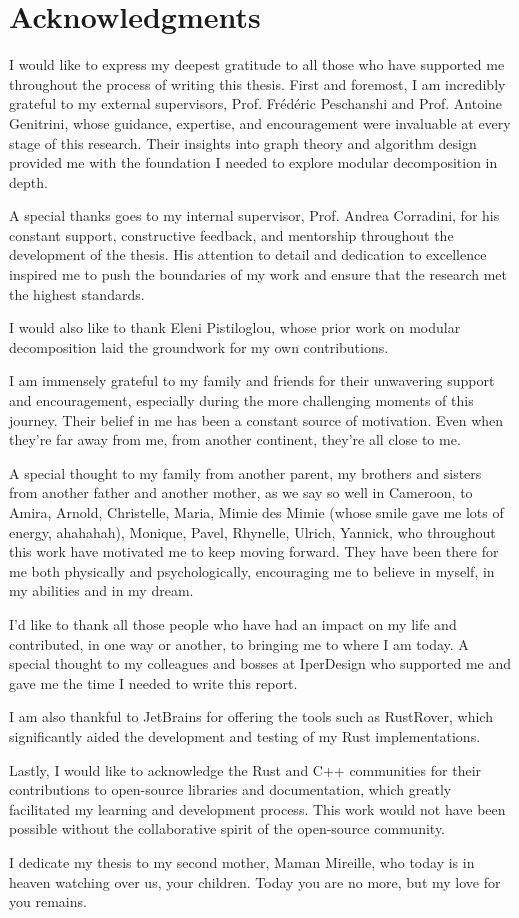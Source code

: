 

\chapter*{Acknowledgments}\label{ch:acknowledgments}

I would like to express my deepest gratitude to all those who have supported me throughout the process of writing this thesis.
First and foremost, I am incredibly grateful to my external supervisors, Prof. Frédéric Peschanshi and Prof. Antoine Genitrini, whose guidance, expertise, and encouragement were invaluable at every stage of this research.
Their insights into graph theory and algorithm design provided me with the foundation I needed to explore modular decomposition in depth.

A special thanks goes to my internal supervisor, Prof. Andrea Corradini, for his constant support, constructive feedback, and mentorship throughout the development of the thesis.
His attention to detail and dedication to excellence inspired me to push the boundaries of my work and ensure that the research met the highest standards.

I would also like to thank Eleni Pistiloglou, whose prior work on modular decomposition laid the groundwork for my own contributions.

I am immensely grateful to my family and friends for their unwavering support and encouragement, especially during the more challenging moments of this journey.
Their belief in me has been a constant source of motivation.
Even when they're far away from me, from another continent, they're all close to me.

A special thought to my family from another parent, my brothers and sisters from another father and another mother, as we say so well in Cameroon, to Amira, Arnold, Christelle, Maria, Mimie des Mimie (whose smile gave me lots of energy, ahahahah), Monique, Pavel, Rhynelle, Ulrich, Yannick, who throughout this work have motivated me to keep moving forward.
They have been there for me both physically and psychologically, encouraging me to believe in myself, in my abilities and in my dream.

I'd like to thank all those people who have had an impact on my life and contributed, in one way or another, to bringing me to where I am today.
A special thought to my colleagues and bosses at IperDesign who supported me and gave me the time I needed to write this report.

I am also thankful to JetBrains for offering the tools such as RustRover, which significantly aided the development and testing of my Rust implementations.

Lastly, I would like to acknowledge the Rust and C++ communities for their contributions to open-source libraries and documentation, which greatly facilitated my learning and development process.
This work would not have been possible without the collaborative spirit of the open-source community.

I dedicate my thesis to my second mother, Maman Mireille, who today is in heaven watching over us, your children.
Today you are no more, but my love for you remains.


